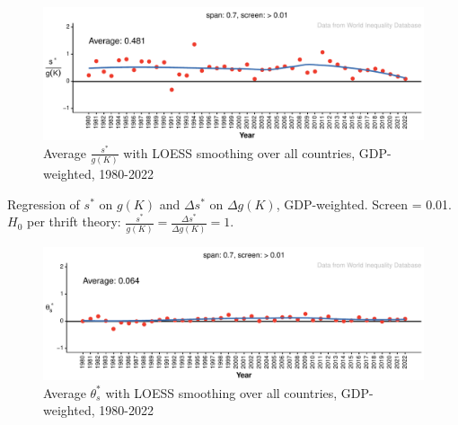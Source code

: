 \documentclass[a4paper,fleqn]{latex_styles/cas-sc}
\begin{document}
\FloatBarrier
\begin{figure}[pos=H]
    \centering
        \includegraphics[width=1\textwidth]{./figure-pdf/fig-s_c_theta_plots-1.pdf}
    \captionsetup{justification=centering}
    \caption{\textcolor[HTML]{EF3B2C}{Average \(\frac{s^*}{g(K)}\)} with \textcolor[HTML]{386CB0}{LOESS smoothing} over all countries, GDP-weighted, 1980-2022} %
    \label{fig-s_c_theta_plots}
\end{figure}
%
\vfill
%
\begin{table}[pos=h]
    \caption{Regression of \(s^*\) on \(g(K)\) and \(\Delta s^*\) on \(\Delta g(K)\), GDP-weighted. Screen = 0.01. \(H_0\) per thrift theory: \(\frac{s^*}{g(K)} = \frac{\Delta s^*}{\Delta g(K)} = 1\).\label{tbl-reg_s}}
    \toprule
    \centering
\begin{minipage}{0.45\textwidth}

\end{minipage}
\hfill
    \begin{minipage}{0.45\textwidth}

\end{minipage}
\bottomrule
\end{table}
%
\vfill
%
\begin{figure}[pos=H]
    \centering
        \includegraphics[width=1\textwidth]{./figure-pdf/fig-si_plots-1.pdf}
    \captionsetup{justification=centering}
    \caption{\textcolor[HTML]{EF3B2C}{Average \(\theta_s^*\)} with \textcolor[HTML]{386CB0}{LOESS smoothing} over all countries, GDP-weighted, 1980-2022} %
    \label{fig-si_plots}
\end{figure}
%
\FloatBarrier

\FloatBarrier
%
\end{document}
